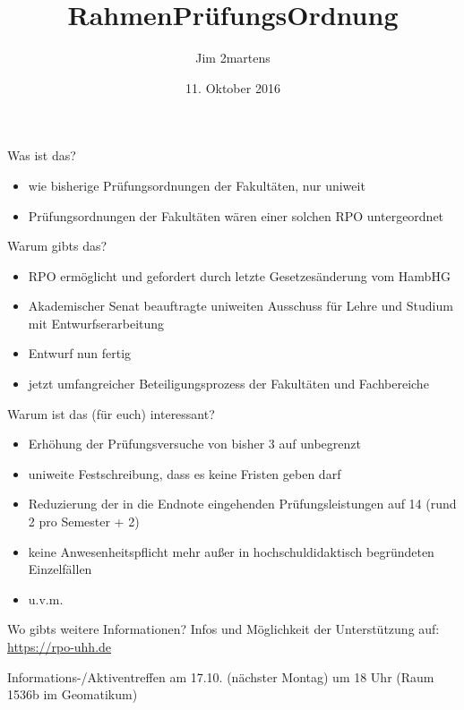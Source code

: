 \documentclass{beamer}
\begin{document}
\author{Jim 2martens}
\title{RahmenPrüfungsOrdnung}
\date{11. Oktober 2016}

\begin{frame}
  \titlepage
\end{frame}

\begin{frame}{Was ist das?}
  \begin{itemize}
    \item wie bisherige Prüfungsordnungen der Fakultäten, nur uniweit
    \item Prüfungsordnungen der Fakultäten wären einer solchen RPO untergeordnet
  \end{itemize}
\end{frame}

\begin{frame}{Warum gibts das?}
  \begin{itemize}
    \item RPO ermöglicht und gefordert durch letzte Gesetzesänderung vom HambHG
    \item Akademischer Senat beauftragte uniweiten Ausschuss für Lehre und Studium mit Entwurfserarbeitung
    \item Entwurf nun fertig
    \item jetzt umfangreicher Beteiligungsprozess der Fakultäten und Fachbereiche
  \end{itemize}
\end{frame}

\begin{frame}{Warum ist das (für euch) interessant?}
  \begin{itemize}
    \item Erhöhung der Prüfungsversuche von bisher 3 auf unbegrenzt
    \item uniweite Festschreibung, dass es keine Fristen geben darf
    \item Reduzierung der in die Endnote eingehenden Prüfungsleistungen auf 14 (rund 2 pro Semester + 2)
    \item keine Anwesenheitspflicht mehr außer in hochschuldidaktisch begründeten Einzelfällen
    \item u.v.m.
  \end{itemize}
\end{frame}

\begin{frame}{Wo gibts weitere Informationen?}
  \centering
  Infos und Möglichkeit der Unterstützung auf:
  \url{https://rpo-uhh.de}

  Informations-/Aktiventreffen am 17.10. (nächster Montag) um 18 Uhr (Raum 1536b im Geomatikum)
\end{frame}
\end{document}
